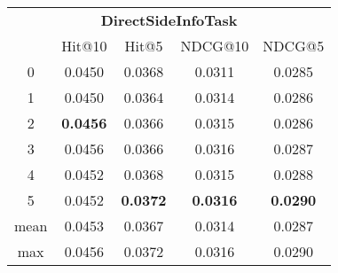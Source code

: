 \documentclass{article}
\begin{document}
 

\begin{tabular}{c|cccc}

\multicolumn{5}{c}{\textbf{DirectSideInfoTask}} \\
\noalign{\smallskip}
\noalign{\smallskip}
\toprule
\multicolumn{1}{c}{Template ID} & \multicolumn{1}{|c}{Hit@10} & \multicolumn{1}{c}{Hit@5} & \multicolumn{1}{c}{NDCG@10} & \multicolumn{1}{c}{NDCG@5} \\
\midrule
0 & 0.0450 & 0.0368 & 0.0311 & 0.0285 \\
1 & 0.0450 & 0.0364 & 0.0314 & 0.0286 \\
2 & \textbf{0.0456} & 0.0366 & 0.0315 & 0.0286 \\
3 & 0.0456 & 0.0366 & 0.0316 & 0.0287 \\
4 & 0.0452 & 0.0368 & 0.0315 & 0.0288 \\
5 & 0.0452 & \textbf{0.0372} & \textbf{0.0316} & \textbf{0.0290} \\
\midrule
mean & 0.0453 & 0.0367 & 0.0314 & 0.0287 \\
max & 0.0456 & 0.0372 & 0.0316 & 0.0290 \\
\bottomrule

\end{tabular}
\end{document}
